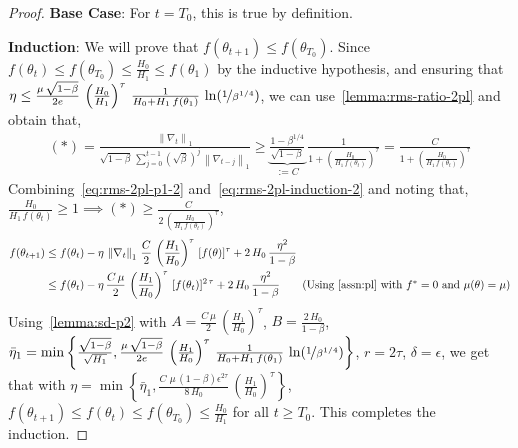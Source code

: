 \documentclass{article}
\newcommand{\norm}[1]{\left\|#1 \right\|}
\newcommand{\tht}{\theta_t}
\newcommand{\thtt}{\theta_{t+1}}
\begin{document}
\begin{proof}
\textbf{Base Case}: For $t = T_0$, this is true by definition. 

\textbf{Induction}: We will prove that $f(\thtt) \leq f(\theta_{T_0})$. Since $f(\tht) \leq f(\theta_{T_0}) \leq \frac{H_0}{H_1} \leq f(\theta_1)$ by the inductive hypothesis, and ensuring that $\eta \leq \frac{\mu \, \sqrt{1 - \beta}}{2 e} \, \left(\frac{H_0}{H_1}\right)^{\tau} \, \frac{1}{H_0 + H_1 \, f(\theta_1)} \, \ln(\nicefrac{1}{\beta^{1/4}})$, we can use~\cref{lemma:rms-ratio-2pl} and obtain that, 
\begin{align}
(*) = \frac{\norm{\nabla_t}_1}{\sqrt{1 - \beta} \, \sum_{j = 0}^{t-1} (\sqrt{\beta})^{j} \, \norm{\nabla_{t-j}}_1} \geq \underbrace{\frac{1 - \beta^{1/4}}{\sqrt{1 - \beta}}}_{:= C} \, \frac{1}{1 + \left( \frac{H_0}{H_1 \, f(\tht)} \right)^{\tau} }  = \frac{C}{1 + \left( \frac{H_0}{H_1 \, f(\tht)} \right)^{\tau} }  \label{eq:rms-2pl-induction-2}
\end{align}
Combining~\cref{eq:rms-2pl-p1-2} and~\cref{eq:rms-2pl-induction-2} and noting that, $\frac{H_0}{H_1 \, f(\tht)} \geq 1 \implies (*) \geq \frac{C}{2 \, \left( \frac{H_0}{H_1 \, f(\tht)} \right)^{\tau}}$, 
\begin{align*}
f(\thtt) & \leq f(\tht) - \eta \, \norm{\nabla_t}_1 \, \frac{C}{2} \, \left(\frac{H_1}{H_0}\right)^\tau \, [f(\theta)]^\tau +  2 \, H_0  \, \frac{\eta^2}{1 - \beta} \\
& \leq f(\tht) - \eta \, \frac{C \, \mu}{2} \, \left( \frac{H_1}{H_0} \right)^\tau \, [f(\tht)]^{2 \, \tau} +  2 \, H_0   \, \frac{\eta^2}{1 - \beta} \tag{Using~\cref{assn:pl} with $f^* = 0$ and $\mu(\theta) = \mu$}
\end{align*}
Using~\cref{lemma:sd-p2} with $A = \frac{C \, \mu}{2} \, \left( \frac{H_1}{H_0} \right)^\tau$, $B = \frac{2 \, H_0}{1- \beta}$, $\bar{\eta}_1 = \min\left\{\frac{\sqrt{1-\beta}}{\sqrt{H_1}}, \frac{\mu \, \sqrt{1 - \beta}}{2 e} \, \left( \frac{H_1}{H_0} \right)^\tau \, \frac{1}{H_0 + H_1 \, f(\theta_1)} \, \ln(\nicefrac{1}{\beta^{1/4}})\right\}$, $r = 2\tau$,  $\delta = \epsilon$, we get that with $\eta = \min\left\{\bar{\eta}_1, \frac{C \, \, \mu \, (1-\beta) \epsilon^{2\tau}}{8  \, H_0} \, \left( \frac{H_1}{H_0} \right)^\tau \right\}$, $f(\thtt) \leq f(\tht) \leq f(\theta_{T_0}) \leq \frac{H_0}{H_1}$ for all $t \geq T_0$. This completes the induction.


\end{proof}
\end{document}
